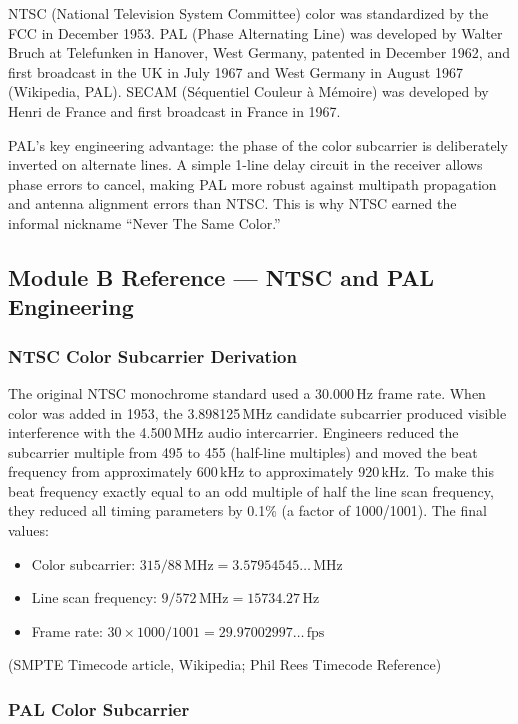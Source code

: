 \documentclass[11pt,letterpaper]{article}
\begin{document}
NTSC (National Television System Committee) color was standardized by the FCC in December 1953.
PAL (Phase Alternating Line) was developed by Walter Bruch at Telefunken in Hanover, West Germany,
patented in December 1962, and first broadcast in the UK in July 1967 and West Germany in August 1967
(Wikipedia, PAL). SECAM (Séquentiel Couleur à Mémoire) was developed by Henri de France and first
broadcast in France in 1967.

PAL's key engineering advantage: the phase of the color subcarrier is deliberately inverted on
alternate lines. A simple 1-line delay circuit in the receiver allows phase errors to cancel,
making PAL more robust against multipath propagation and antenna alignment errors than NTSC.
This is why NTSC earned the informal nickname ``Never The Same Color.''

\subsection{Module B Reference --- NTSC and PAL Engineering}

\subsubsection{NTSC Color Subcarrier Derivation}

The original NTSC monochrome standard used a 30.000\,Hz frame rate. When color was added in 1953,
the 3.898125\,MHz candidate subcarrier produced visible interference with the 4.500\,MHz audio
intercarrier. Engineers reduced the subcarrier multiple from 495 to 455 (half-line multiples) and
moved the beat frequency from approximately 600\,kHz to approximately 920\,kHz. To make this beat
frequency exactly equal to an odd multiple of half the line scan frequency, they reduced all timing
parameters by 0.1\% (a factor of 1000/1001). The final values:
\begin{itemize}[leftmargin=*]
  \item Color subcarrier: $315/88\,\text{MHz} = 3.57954545\ldots\,\text{MHz}$
  \item Line scan frequency: $9/572\,\text{MHz} = 15734.27\,\text{Hz}$
  \item Frame rate: $30 \times 1000/1001 = 29.97002997\ldots\,\text{fps}$
\end{itemize}
(SMPTE Timecode article, Wikipedia; Phil Rees Timecode Reference)

\subsubsection{PAL Color Subcarrier}
\end{document}
